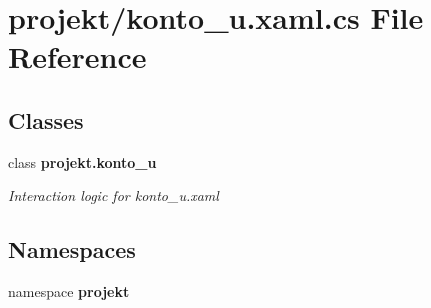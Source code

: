 \section{projekt/konto\+\_\+u.xaml.\+cs File Reference}
\label{konto__u_8xaml_8cs}
\subsection*{Classes}
\begin{DoxyCompactItemize}
\item 
class \textbf{ projekt.\+konto\+\_\+u}
\begin{DoxyCompactList}\small\item\em Interaction logic for konto\+\_\+u.\+xaml \end{DoxyCompactList}\end{DoxyCompactItemize}
\subsection*{Namespaces}
\begin{DoxyCompactItemize}
\item 
namespace \textbf{ projekt}
\end{DoxyCompactItemize}
